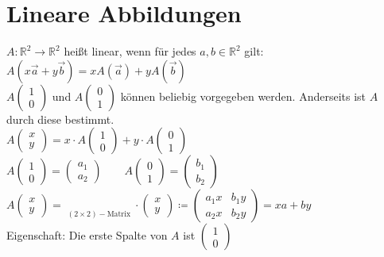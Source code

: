 \section{Lineare Abbildungen}
$A: \mathbb{R}^{2} \rightarrow \mathbb{R}^{2}$ heißt linear, wenn für jedes $a,b \in \mathbb{R}^{2}$ gilt: $A(x\vec{a} + y \vec{b})=xA(\vec{a}) + yA(\vec{b})$\\

$A\begin{pmatrix} 1\\0 \end{pmatrix}$ und $A\begin{pmatrix} 0 \\ 1 \end{pmatrix}$ können beliebig vorgegeben werden. Anderseits ist $A$ durch diese bestimmt.\\

$A\begin{pmatrix} x \\ y \end{pmatrix}= x\cdot A\begin{pmatrix} 1 \\ 0 \end{pmatrix} + y \cdot A\begin{pmatrix} 0 \\ 1 \end{pmatrix}$ \\

$A\begin{pmatrix}1 \\ 0 \end{pmatrix} = \begin{pmatrix} a_{1} \\ a_{2} \end{pmatrix} \qquad A\begin{pmatrix} 0 \\ 1 \end{pmatrix} = \begin{pmatrix} b_{1} \\ b_{2} \end{pmatrix}$ \\

$A\begin{pmatrix} x \\ y \end{pmatrix} = \mathop{\underbrace{\begin{pmatrix} a_{1} & b_{1} \\ a_{2} & b_{2} \end{pmatrix}}}\limits_{(2\times 2) - \textrm{Matrix}} \cdot \begin{pmatrix} x \\ y \end{pmatrix} \coloneq \begin{pmatrix} a_{1}x & b_{1} y \\ a_{2}x & b_{2}y\end{pmatrix} = xa+by$\\
Eigenschaft: Die erste Spalte von $A$ ist $\begin{pmatrix}1 \\ 0 \end{pmatrix}$
